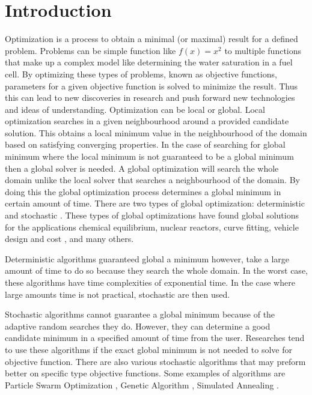 
\chapter{Introduction}
\label{introduction}

Optimization is a process to obtain a minimal (or maximal) result for a defined problem. Problems can be simple function like $f(x) = x^2$ to multiple functions that make up a complex model like determining the water saturation in a fuel cell. By optimizing these types of problems, known as objective functions, parameters for a given objective function is solved to minimize the result. Thus this can lead to new discoveries in research and push forward new technologies and ideas of understanding.
Optimization can be local or global. Local optimization searches in a given neighbourhood around a provided candidate solution. This obtains a local minimum value in the neighbourhood of the domain based on satisfying converging properties. In the case of searching for global minimum where the local minimum is not guaranteed to be a global minimum then a global solver is needed. A global optimization will search the whole domain unlike the local solver that searches a
neighbourhood of the domain. By doing this the global optimization process determines a global minimum in certain amount of time. There are two types of global optimization: deterministic and stochastic \cite{Liberti2000}. These types of global optimizations have found global solutions for the applications chemical equilibrium, nuclear reactors, curve fitting, vehicle design and cost \cite{Pinter2002}, and many others.

Deterministic algorithms guaranteed global a minimum however, take a large amount of time to do so because they search the whole domain. In the worst case, these algorithms have time complexities of exponential time. In the case where large amounts time is not practical, stochastic are then used. 

Stochastic algorithms cannot guarantee a global minimum because of the adaptive random searches they do. However, they can determine a good candidate minimum in a specified amount of time from the user. Researches tend to use these algorithms if the exact global minimum is not needed to solve for objective function. There are also various stochastic algorithms that may preform better on specific type objective functions. Some examples of algorithms are Particle Swarm
Optimization \cite{Kennedy}, Genetic Algorithm \cite{}, Simulated Annealing \cite{}. 

